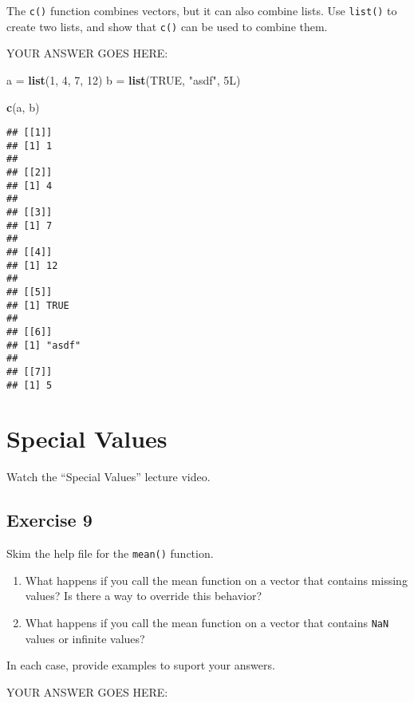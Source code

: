 \documentclass[
]{article}
\newenvironment{Shaded}{\begin{snugshade}}{\end{snugshade}}
\newcommand{\DecValTok}[1]{\textcolor[rgb]{0.00,0.00,0.81}{#1}}
\newcommand{\KeywordTok}[1]{\textcolor[rgb]{0.13,0.29,0.53}{\textbf{#1}}}
\newcommand{\NormalTok}[1]{#1}
\newcommand{\OtherTok}[1]{\textcolor[rgb]{0.56,0.35,0.01}{#1}}
\newcommand{\StringTok}[1]{\textcolor[rgb]{0.31,0.60,0.02}{#1}}
\begin{document}
The \texttt{c()} function combines vectors, but it can also combine
lists. Use \texttt{list()} to create two lists, and show that
\texttt{c()} can be used to combine them.

YOUR ANSWER GOES HERE:

\begin{Shaded}
\begin{Highlighting}[]
\NormalTok{a =}\StringTok{ }\KeywordTok{list}\NormalTok{(}\DecValTok{1}\NormalTok{, }\DecValTok{4}\NormalTok{, }\DecValTok{7}\NormalTok{, }\DecValTok{12}\NormalTok{)}
\NormalTok{b =}\StringTok{ }\KeywordTok{list}\NormalTok{(}\OtherTok{TRUE}\NormalTok{, }\StringTok{"asdf"}\NormalTok{, 5L)}

\KeywordTok{c}\NormalTok{(a, b)}
\end{Highlighting}
\end{Shaded}

\begin{verbatim}
## [[1]]
## [1] 1
## 
## [[2]]
## [1] 4
## 
## [[3]]
## [1] 7
## 
## [[4]]
## [1] 12
## 
## [[5]]
## [1] TRUE
## 
## [[6]]
## [1] "asdf"
## 
## [[7]]
## [1] 5
\end{verbatim}

\hypertarget{special-values}{%
\section{Special Values}\label{special-values}}

Watch the ``Special Values'' lecture video.

\hypertarget{exercise-9}{%
\subsection{Exercise 9}\label{exercise-9}}

Skim the help file for the \texttt{mean()} function.

\begin{enumerate}
\def\labelenumi{\arabic{enumi}.}
\item
  What happens if you call the mean function on a vector that contains
  missing values? Is there a way to override this behavior?
\item
  What happens if you call the mean function on a vector that contains
  \texttt{NaN} values or infinite values?
\end{enumerate}

In each case, provide examples to suport your answers.

YOUR ANSWER GOES HERE:
\end{document}
